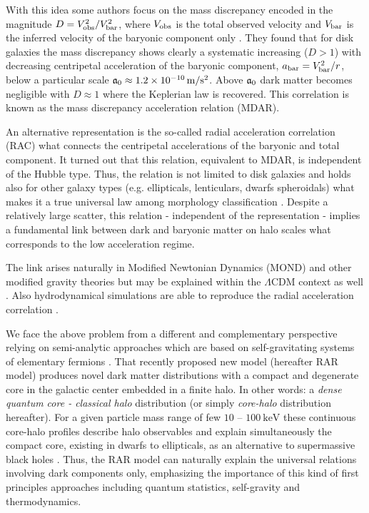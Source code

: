 With this idea some authors focus on the mass discrepancy encoded in the magnitude $D = V_\mathrm{obs}^2/V_\mathrm{bar}^2$, where $V_\mathrm{obs}$ is the total observed velocity and $V_\mathrm{bar}$ is the inferred velocity of the baryonic component only \citep{2004ApJ...609..652M,2014Galax...2..601M}. They found that for disk galaxies the mass discrepancy shows clearly a systematic increasing ($D > 1$) with decreasing centripetal acceleration of the baryonic component, $a_\mathrm{bar} = V_\mathrm{bar}^2/r$, below a particular scale $\mathfrak{a}_0 \approx \SI{1.2E-10}{\metre/\second^2}$. Above $\mathfrak{a}_0$ dark matter becomes negligible with $D\approx 1$ where the Keplerian law is recovered. This correlation is known as the mass discrepancy acceleration relation (MDAR).

An alternative representation is the so-called radial acceleration correlation (RAC) what connects the centripetal accelerations of the baryonic and total component. It turned out that this relation, equivalent to MDAR, is independent of the Hubble type. Thus, the relation is not limited to disk galaxies and holds also for other galaxy types (e.g. ellipticals, lenticulars, dwarfs spheroidals) what makes it a true universal law among morphology classification \citep{2017ApJ...836..152L}. Despite a relatively large scatter, this relation - independent of the representation - implies a fundamental link between dark and baryonic matter on halo scales what corresponds to the low acceleration regime.

The link arises naturally in Modified Newtonian Dynamics (MOND) and other modified gravity theories \citep{2015CaJPh..93..169K,2016arXiv160905917M,2017arXiv170204355L} but may be explained within the $\Lambda$CDM context as well \citep{2016MNRAS.456L.127D,2016arXiv161206329N,2016arXiv161208857S}. Also hydrodynamical simulations are able to reproduce the radial acceleration correlation \citep{2016MNRAS.455..476S,2016arXiv161006183K,2016arXiv161007663L,2017arXiv170305287T}.

We face the above problem from a different and complementary perspective relying on semi-analytic approaches which are based on self-gravitating systems of elementary fermions \citep{arguelles_novel_2018,2015MNRAS.451..622R,2015ARep...59..656S,2014JKPS...65..809A,2014IJMPD..2342020A,2014JKPS...65..801A}. That recently proposed new model (hereafter RAR model) produces novel dark matter distributions with a compact and degenerate core in the galactic center embedded in a finite halo. In other words: a \textit{dense quantum core - classical halo} distribution (or simply \textit{core-halo} distribution hereafter). For a given particle mass range of few $10$ -- $\SI{100}{\kilo\eV}$ these continuous core-halo profiles describe halo observables and explain simultaneously the compact core, existing in dwarfs to ellipticals, as an alternative to supermassive black holes \citep{2015MNRAS.451..622R,arguelles_novel_2018}. Thus, the RAR model can naturally explain the universal relations involving dark components only, emphasizing the importance of this kind of first principles approaches including quantum statistics, self-gravity and thermodynamics.

